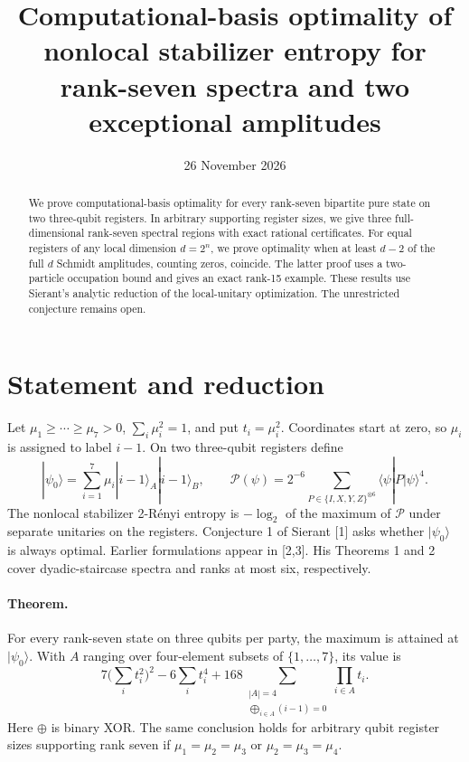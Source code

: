 \documentclass[11pt]{article}
\title{Computational-basis optimality of nonlocal stabilizer entropy for rank-seven spectra and two exceptional amplitudes}
\date{26 November 2026}
\begin{document}
\maketitle
\begin{abstract}
We prove computational-basis optimality for every rank-seven bipartite pure state on two three-qubit registers. In arbitrary supporting register sizes, we give three full-dimensional rank-seven spectral regions with exact rational certificates. For equal registers of any local dimension $d=2^n$, we prove optimality when at least $d-2$ of the full $d$ Schmidt amplitudes, counting zeros, coincide. The latter proof uses a two-particle occupation bound and gives an exact rank-15 example. These results use Sierant's analytic reduction of the local-unitary optimization. The unrestricted conjecture remains open.
\end{abstract}

\section{Statement and reduction}
Let $\mu_1\geq\cdots\geq\mu_7>0$, $\sum_i\mu_i^2=1$, and put $t_i=\mu_i^2$. Coordinates start at zero, so $\mu_i$ is assigned to label $i-1$. On two three-qubit registers define
\[
 |\psi_0\rangle=\sum_{i=1}^{7}\mu_i|i-1\rangle_A|i-1\rangle_B,\qquad
 \mathcal P(\psi)=2^{-6}\sum_{P\in\{I,X,Y,Z\}^{\otimes6}}\langle\psi|P|\psi\rangle^4.
\]
The nonlocal stabilizer 2-R\'enyi entropy is $-\log_2$ of the maximum of $\mathcal P$ under separate unitaries on the registers. Conjecture 1 of Sierant [1] asks whether $|\psi_0\rangle$ is always optimal. Earlier formulations appear in [2,3]. His Theorems 1 and 2 cover dyadic-staircase spectra and ranks at most six, respectively.

\paragraph{Theorem.} For every rank-seven state on three qubits per party, the maximum is attained at $|\psi_0\rangle$. With $A$ ranging over four-element subsets of $\{1,\ldots,7\}$, its value is
\[
 7\Big(\sum_i t_i^2\Big)^2-6\sum_i t_i^4
     +168\!\!\!\sum_{\substack{|A|=4\\ \bigoplus_{i\in A}(i-1)=0}}\prod_{i\in A}t_i .
 \tag{1}
\]
Here $\oplus$ is binary XOR. The same conclusion holds for arbitrary qubit register sizes supporting rank seven if $\mu_1=\mu_2=\mu_3$ or $\mu_2=\mu_3=\mu_4$.
\end{document}
